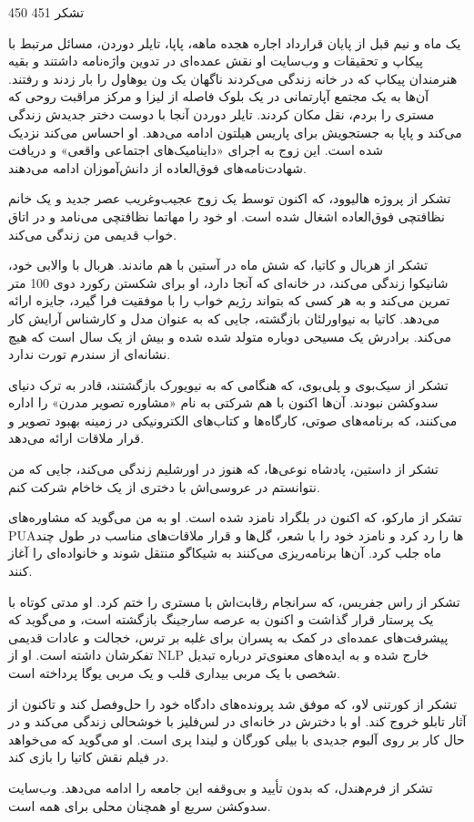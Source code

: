 450 تشکر 451

یک ماه و نیم قبل از پایان قرارداد اجاره هجده ماهه، پاپا، تایلر دوردن، مسائل مرتبط با پیکاپ و تحقیقات و وب‌سایت او نقش عمده‌ای در تدوین واژه‌نامه داشتند و بقیه هنرمندان پیکاپ که در خانه زندگی می‌کردند ناگهان یک ون یو‌هاول را بار زدند و رفتند. آن‌ها به یک مجتمع آپارتمانی در یک بلوک فاصله از لیزا و مرکز مراقبت روحی که مستری را بردم، نقل مکان کردند. تایلر دوردن آنجا با دوست دختر جدیدش زندگی می‌کند و پاپا به جستجویش برای پاریس هیلتون ادامه می‌دهد. او احساس می‌کند نزدیک شده است. این زوج به اجرای «داینامیک‌های اجتماعی واقعی» و دریافت شهادت‌نامه‌های فوق‌العاده از دانش‌آموزان ادامه می‌دهند.

تشکر از پروژه هالیوود، که اکنون توسط یک زوج عجیب‌وغریب عصر جدید و یک خانم نظافتچی فوق‌العاده اشغال شده است. او خود را مهاتما نظافتچی می‌نامد و در اتاق خواب قدیمی من زندگی می‌کند. 

تشکر از هربال و کاتیا، که شش ماه در آستین با هم ماندند. هربال با والابی خود، شانیکوا زندگی می‌کند، در خانه‌ای که آنجا دارد، او برای شکستن رکورد دوی 100 متر تمرین می‌کند و به هر کسی که بتواند رژیم خواب را با موفقیت فرا گیرد، جایزه ارائه می‌دهد. کاتیا به نیواورلئان بازگشته، جایی که به عنوان مدل و کارشناس آرایش کار می‌کند. برادرش یک مسیحی دوباره متولد شده شده و بیش از یک سال است که هیچ نشانه‌ای از سندرم تورت ندارد.

تشکر از سیک‌بوی و پلی‌بوی، که هنگامی که به نیویورک بازگشتند، قادر به ترک دنیای سدوکشن نبودند. آن‌ها اکنون با هم شرکتی به نام «مشاوره تصویر مدرن» را اداره می‌کنند، که برنامه‌های صوتی، کارگاه‌ها و کتاب‌های الکترونیکی در زمینه بهبود تصویر و قرار ملاقات ارائه می‌دهد.

تشکر از داستین، پادشاه نوعی‌ها، که هنوز در اورشلیم زندگی می‌کند، جایی که من نتوانستم در عروسی‌اش با دختری از یک خاخام شرکت کنم.

تشکر از مارکو، که اکنون در بلگراد نامزد شده است. او به من می‌گوید که مشاوره‌های PUAها را رد کرد و نامزد خود را با شعر، گل‌ها و قرار ملاقات‌های مناسب در طول چند ماه جلب کرد. آن‌ها برنامه‌ریزی می‌کنند به شیکاگو منتقل شوند و خانواده‌ای را آغاز کنند.

تشکر از راس جفریس، که سرانجام رقابت‌اش با مستری را ختم کرد. او مدتی کوتاه با یک پرستار قرار گذاشت و اکنون به عرصه سارجینگ بازگشته است، و می‌گوید که پیشرفت‌های عمده‌ای در کمک به پسران برای غلبه بر ترس، خجالت و عادات قدیمی تفکرشان داشته است. او از NLP خارج شده و به ایده‌های معنوی‌تر درباره تبدیل شخصی با یک مربی بیداری قلب و یک مربی یوگا پرداخته است.

تشکر از کورتنی لاو، که موفق شد پرونده‌های دادگاه خود را حل‌وفصل کند و تاکنون از آثار تابلو خروج کند. او با دخترش در خانه‌ای در لس‌فلیز با خوشحالی زندگی می‌کند و در حال کار بر روی آلبوم جدیدی با بیلی کورگان و لیندا پری است. او می‌گوید که می‌خواهد در فیلم نقش کاتیا را بازی کند.

تشکر از فرم‌هندل، که بدون تأیید و بی‌وقفه این جامعه را ادامه می‌دهد. وب‌سایت سدوکشن سریع او همچنان محلی برای همه است.